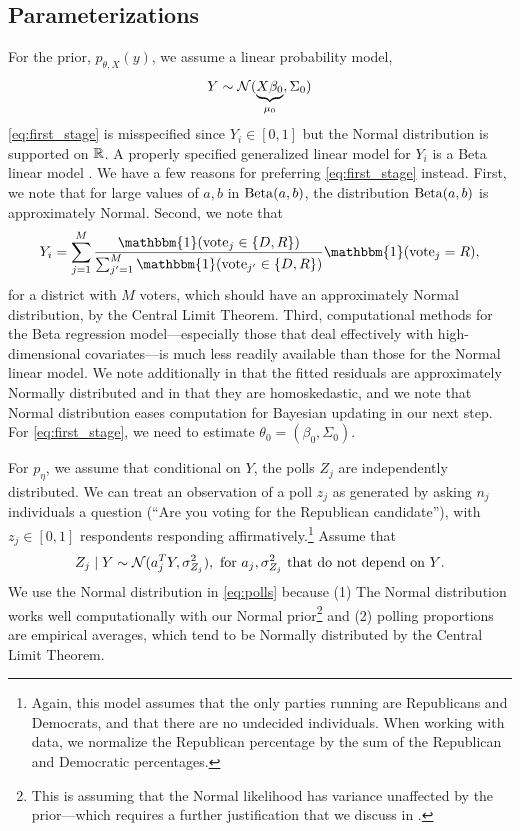 \documentclass[11pt]{article}
\begin{document}
\subsection{Parameterizations}

For the prior, $p_{\theta, X}(y)$, we assume a linear probability model,
\begin{equation}
    Y \sim \mathcal{N}(\underbrace{X\beta_0}_{\mu_0}, \Sigma_0)
    \label{eq:first_stage}
\end{equation}
\eqref{eq:first_stage} is misspecified since $Y_i \in [0,1]$ but the Normal
distribution is supported on $\mathbb{R}$. A properly specified generalized linear model
for $Y_i$ is a Beta linear model \citep[See][for an overview]{grun2011extended}.
We have a few reasons for preferring \eqref{eq:first_stage} instead. First, we
note that for large values of $a,b$ in $\operatorname{Beta}(a,b)$, the distribution
$\operatorname{Beta}(a,b)$ is approximately Normal. Second, we note that \[Y_i =
\sum_{j=1}^M \frac{\mathbbm{1} (\text{vote}_j \in \{D,R\})}{\sum_{j'=1}^M \mathbbm{1}
(\text{vote}_{j'} \in \{D,R\})} \mathbbm{1}(\text{vote}_j = R),\] for a district with
$M$ voters, which should have an approximately Normal distribution, by the
Central Limit Theorem. Third, computational methods for the Beta regression
model---especially those that deal effectively with high-dimensional
covariates---is much less readily available than those for the Normal linear
model. We note additionally in  that the fitted residuals are
approximately Normally distributed and in  that they are homoskedastic, and we note that Normal distribution eases
computation for Bayesian updating in our next step. For \eqref{eq:first_stage},
we need to estimate $\theta_0 = (\beta_0, \Sigma_0)$. 

For $p_{\eta}$, we assume that conditional on $Y$, the polls $Z_j$ are
independently distributed. We can treat an observation of a poll $z_j$ as
generated by
asking $n_j$
individuals a question (``Are you voting for the Republican candidate''), with
$z_j \in [0,1]$ respondents responding
affirmatively.\footnote{Again, this model assumes that the only parties running
are Republicans and Democrats, and that there are no undecided individuals.
When working with data, we normalize the Republican percentage by the sum of
the Republican and Democratic percentages.}
Assume that 
\begin{equation}
    Z_j \mid Y \sim \mathcal{N}(a_j^T Y, \sigma_{Z_j}^2), \text{ for $a_j, \sigma_
    {Z_j}^2$ that do not depend on $Y$}.
    \label{eq:polls}
\end{equation}
We use the Normal distribution in \eqref{eq:polls} because (1) The Normal
distribution works well computationally with our Normal prior\footnote{This is
assuming that the Normal likelihood has variance unaffected by the
prior---which requires a further justification that we discuss in 
.} and (2) polling proportions are empirical averages, which
tend to be Normally distributed by the Central Limit Theorem.
\end{document}
